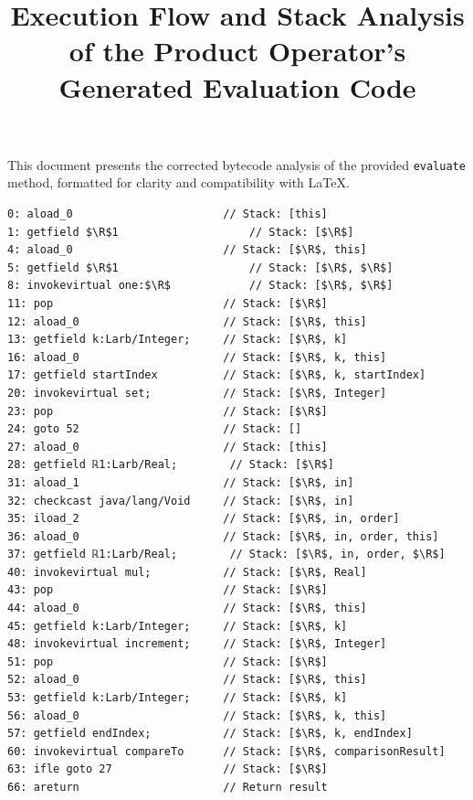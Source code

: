 \documentclass{article}
\newcommand{\R}{\ensuremath{\mathbb{R}}}
\begin{document}
\title{Execution Flow and Stack Analysis of the Product Operator's Generated Evaluation Code}
\maketitle

This document presents the corrected bytecode analysis of the provided \texttt{evaluate} method, formatted for clarity and compatibility with LaTeX.

\begin{lstlisting}
0: aload_0                       // Stack: [this]
1: getfield $\R$1                    // Stack: [$\R$]
4: aload_0                       // Stack: [$\R$, this]
5: getfield $\R$1                    // Stack: [$\R$, $\R$]
8: invokevirtual one:$\R$            // Stack: [$\R$, $\R$] 
11: pop                          // Stack: [$\R$]
12: aload_0                      // Stack: [$\R$, this]
13: getfield k:Larb/Integer;     // Stack: [$\R$, k]
16: aload_0                      // Stack: [$\R$, k, this]
17: getfield startIndex          // Stack: [$\R$, k, startIndex]
20: invokevirtual set;           // Stack: [$\R$, Integer]
23: pop                          // Stack: [$\R$]
24: goto 52                      // Stack: []
27: aload_0                      // Stack: [this] 
28: getfield ℝ1:Larb/Real;        // Stack: [$\R$]
31: aload_1                      // Stack: [$\R$, in]
32: checkcast java/lang/Void     // Stack: [$\R$, in]
35: iload_2                      // Stack: [$\R$, in, order]
36: aload_0                      // Stack: [$\R$, in, order, this]
37: getfield ℝ1:Larb/Real;        // Stack: [$\R$, in, order, $\R$]
40: invokevirtual mul;           // Stack: [$\R$, Real] 
43: pop                          // Stack: [$\R$]
44: aload_0                      // Stack: [$\R$, this]
45: getfield k:Larb/Integer;     // Stack: [$\R$, k]
48: invokevirtual increment;     // Stack: [$\R$, Integer] 
51: pop                          // Stack: [$\R$]
52: aload_0                      // Stack: [$\R$, this]
53: getfield k:Larb/Integer;     // Stack: [$\R$, k]
56: aload_0                      // Stack: [$\R$, k, this]
57: getfield endIndex;           // Stack: [$\R$, k, endIndex]
60: invokevirtual compareTo      // Stack: [$\R$, comparisonResult]
63: ifle goto 27                 // Stack: [$\R$]
66: areturn                      // Return result
\end{lstlisting}
\end{document}
